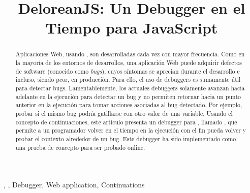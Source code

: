 \documentclass[conference]{IEEEtran}
\begin{document}
\title{DeloreanJS: Un Debugger en el Tiempo para JavaScript}

\author{
\and
{}
\and
{}
}

\maketitle

\begin{abstract}
Aplicaciones Web, usando \javascript, son desarrolladas cada vez con mayor frecuencia. Como en la mayor\'ia de los entornos de desarrollos, una aplicaci\'on Web puede adquirir defectos de software (conocido como {\em bugs}), cuyos s\'intomas se aprecian durante el desarrollo e incluso, siendo peor, en producci\'on. Para ello, el uso de debuggers es sumamente \'util para detectar bugs. Lamentablemente, los actuales debuggers solamente avanzan hacia adelante en la ejecuci\'on para detectar un bug y no permiten retornar hacia un punto anterior en la ejecuci\'on para tomar acciones asociadas al bug detectado. Por ejemplo, probar si el mismo bug podr\'ia gatillarse con otro valor de una variable. Usando el concepto de continuaciones, este art\'iculo presenta un debugger para \javascript, llamado \deloreanjs, que permite a un programador volver en el tiempo en la ejecuci\'on con el fin pueda volver y probar el contexto alrededor de un bug. Este debugger ha sido implementado como una prueba de concepto para ser probado online.         
\end{abstract}

\begin{IEEEkeywords}
\deloreanjs, \javascript, Debugger, Web application, Continuations
\end{IEEEkeywords}
\end{document}
